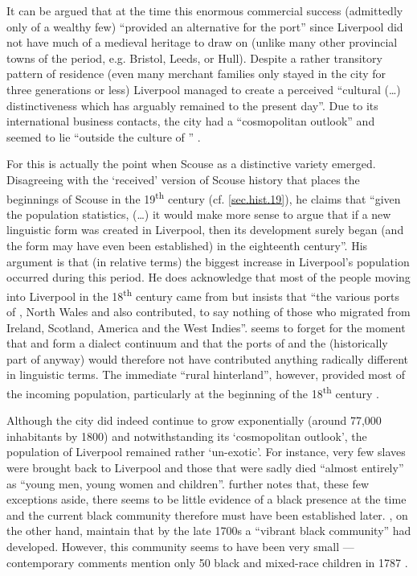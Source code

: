 It can be argued that at the time this enormous commercial success (admittedly only of a wealthy few) ``provided an alternative  for the port'' since Liverpool did not have much of a medieval heritage to draw on (unlike many other provincial towns of the period, e.g. Bristol, Leeds, or Hull).
Despite a rather transitory pattern of residence (even many merchant families only stayed in the city for three generations or less) Liverpool managed to create a perceived ``cultural (\ldots) distinctiveness which has arguably remained to the present day''. Due to its international business contacts, the city had a ``cosmopolitan outlook'' and seemed to lie ``outside the culture of '' \citep[152--154]{longmore2006}.

For \citet[28]{crowley2012} this is actually the point when Scouse as a distinctive variety emerged.
Disagreeing with the `received' version of Scouse history that places the beginnings of Scouse in the 19\textsuperscript{th} century (cf. \ref{sec.hist.19}), he claims that ``given the population statistics, (\dots) it would make more sense to argue that if a new linguistic form was created in Liverpool, then its development surely began (and the form may have even been established) in the eighteenth century''.
His argument is that (in relative terms) the biggest increase in Liverpool's population occurred during this period.
He does acknowledge that most of the people moving into Liverpool in the 18\textsuperscript{th} century came from  but insists that ``the various ports of , North Wales and  also contributed, to say nothing of those who migrated from Ireland, Scotland, America and the West Indies''.
\citeauthor{crowley2012} seems to forget for the moment that  and  form a dialect continuum and that the ports of  and the  (historically part of  anyway) would therefore not have contributed anything radically different in linguistic terms.
The immediate ``rural hinterland'', however, provided most of the incoming population, particularly at the beginning of the 18\textsuperscript{th} century \parencite[cf.][119]{longmore2006}.

Although the city did indeed continue to grow exponentially (around 77,000 inhabitants by 1800) and notwithstanding its `cosmopolitan outlook', the population of Liverpool remained rather `un-exotic'.
For instance, very few slaves were brought back to Liverpool and those that were sadly died ``almost entirely'' as ``young men, young women and children''.
\textcite[cf.][161 and 169]{longmore2006} further notes that, these few exceptions aside, there seems to be little evidence of a black presence at the time and the current black community therefore must have been established later. \textcite{belchemmacraild2006}, on the other hand, maintain that by the late 1700s a ``vibrant black community'' had developed. However, this community seems to have been very small --- contemporary comments mention only 50 black and mixed-race children in 1787 \parencite[324]{belchemmacraild2006}.

